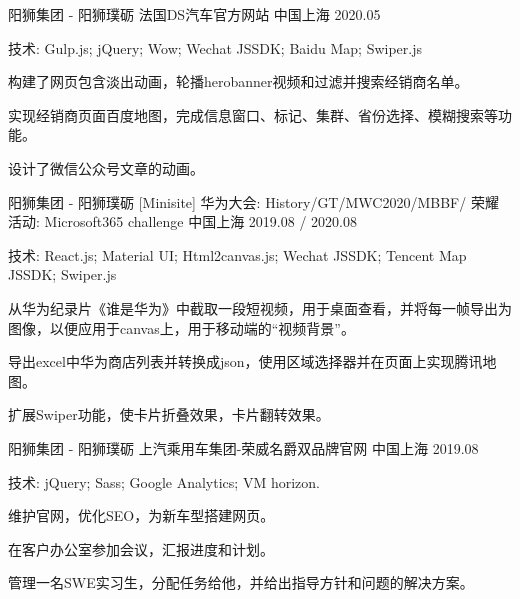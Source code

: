 \begin{cventries}

    \cventry
    {阳狮集团 - 阳狮璞砺} %
    {法国DS汽车官方网站} %
    {中国上海} %
    {2020.05} %
    {
      \begin{cvitems} %
        \item {技术: Gulp.js; jQuery; Wow; Wechat JSSDK; Baidu Map; Swiper.js}
        \item {构建了网页包含淡出动画，轮播herobanner视频和过滤并搜索经销商名单。}
        \item {实现经销商页面百度地图，完成信息窗口、标记、集群、省份选择、模糊搜索等功能。 }
        \item {设计了微信公众号文章的动画。}
      \end{cvitems}
    }
    
    
    \cventry
    {阳狮集团 - 阳狮璞砺} %
    {[Minisite] 华为大会: History/GT/MWC2020/MBBF/ 荣耀活动: Microsoft365 challenge} %
    {中国上海} %
    {2019.08 / 2020.08} %
    {
      \begin{cvitems} %
        \item {技术: React.js; Material UI; Html2canvas.js; Wechat JSSDK; Tencent Map JSSDK; Swiper.js}
        \item {从华为纪录片《谁是华为》中截取一段短视频，用于桌面查看，并将每一帧导出为图像，以便应用于canvas上，用于移动端的“视频背景”。}
        \item {导出excel中华为商店列表并转换成json，使用区域选择器并在页面上实现腾讯地图。}
        \item {扩展Swiper功能，使卡片折叠效果，卡片翻转效果。}
      \end{cvitems}
    }
    
    
    \cventry
    {阳狮集团 - 阳狮璞砺} %
    {上汽乘用车集团-荣威名爵双品牌官网} %
    {中国上海} %
    {2019.08} %
    {
      \begin{cvitems} %
        \item {技术: jQuery; Sass; Google Analytics; VM horizon.}
        \item {维护官网，优化SEO，为新车型搭建网页。}
        \item {在客户办公室参加会议，汇报进度和计划。}
        \item {管理一名SWE实习生，分配任务给他，并给出指导方针和问题的解决方案。}
      \end{cvitems}
    }
    

\end{cventries}
